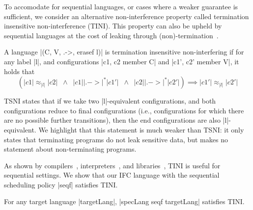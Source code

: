 %
To accomodate for sequential languages, or cases where a weaker guarantee
is sufficient, we consider an alternative non-interference property called termination insensitive
non-interference (TINI).  This property can also be upheld by sequential languages at the cost
of leaking through (non)-termination~\cite{Askarov:2008}.
%
\begin{definition}
  A language |(C, V, .->, erasef l)| is termination
  insensitive non-interfering if for any label |l|, and configurations
  |c1, c2 member C| and |c1', c2' member V|, it holds that
  \[
    (|c1| \approx_{|l|} |c2|
    \;\;\land\;\;
    |c1| |.->|^* |c1'|
    \;\;\land\;\;
    |c2| |.->|^* |c2'|)
    \implies
    |c1'| \approx_{|l|} |c2'|
  \]
\end{definition}

TSNI states that if we take two |l|-equivalent configurations, and both
configurations reduce to final configurations (i.e.,
configurations for which there are no
possible further transitions), then the end configurations are also
|l|-equivalent.
%
We highlight that this statement is much weaker than TSNI: it only states that
terminating programs do not leak sensitive data, but makes no statement
about non-terminating programs.

As shown by compilers~\cite{jif,FlowCaml}, interpreters~\cite{JSFlow}, and
libraries~\cite{Russo+:Haskell08,lio}, TINI is useful for sequential
settings. We show that our IFC language with the sequential scheduling policy
|seqf| satisfies TINI.
%
\begin{theorem}
  \label{thm:seq-tini}
For any target language |targetLang|, |specLang seqf targetLang| satisfies TINI.
\end{theorem}



